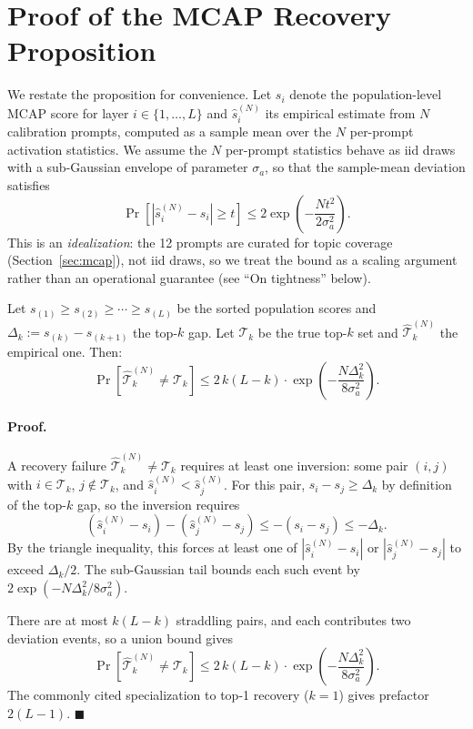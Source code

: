 \documentclass{article}
\begin{document}
\section{Proof of the MCAP Recovery Proposition}
\label{app:mcap_proof}

We restate the proposition for convenience. Let $s_i$ denote the population-level MCAP
score for layer $i \in \{1, \ldots, L\}$ and $\hat{s}_i^{(N)}$ its empirical estimate from
$N$ calibration prompts, computed as a sample mean over the $N$ per-prompt activation
statistics. We assume the $N$ per-prompt statistics behave as iid draws with a
sub-Gaussian envelope of parameter $\sigma_a$, so that the sample-mean deviation
satisfies
\[
  \Pr\!\left[ \left| \hat{s}_i^{(N)} - s_i \right| \geq t \right] \leq 2 \exp\!\left( -\frac{N t^2}{2 \sigma_a^2} \right).
\]
This is an \emph{idealization}: the 12 prompts are curated for topic coverage
(Section~\ref{sec:mcap}), not iid draws, so we treat the bound as a scaling argument
rather than an operational guarantee (see ``On tightness'' below).

Let $s_{(1)} \geq s_{(2)} \geq \cdots \geq s_{(L)}$ be the sorted population scores and
$\Delta_k := s_{(k)} - s_{(k+1)}$ the top-$k$ gap. Let $\mathcal{T}_k$ be the true top-$k$
set and $\hat{\mathcal{T}}_k^{(N)}$ the empirical one. Then:
\[
  \Pr\!\left[ \hat{\mathcal{T}}_k^{(N)} \neq \mathcal{T}_k \right] \leq 2\,k(L-k) \cdot \exp\!\left( -\frac{N \Delta_k^2}{8 \sigma_a^2} \right).
\]

\paragraph{Proof.} A recovery failure $\hat{\mathcal{T}}_k^{(N)} \neq \mathcal{T}_k$
requires at least one inversion: some pair $(i, j)$ with $i \in \mathcal{T}_k$,
$j \notin \mathcal{T}_k$, and $\hat{s}_i^{(N)} < \hat{s}_j^{(N)}$. For this pair,
$s_i - s_j \geq \Delta_k$ by definition of the top-$k$ gap, so the inversion requires
\[
  (\hat{s}_i^{(N)} - s_i) - (\hat{s}_j^{(N)} - s_j) \leq -(s_i - s_j) \leq -\Delta_k.
\]
By the triangle inequality, this forces at least one of $|\hat{s}_i^{(N)} - s_i|$ or
$|\hat{s}_j^{(N)} - s_j|$ to exceed $\Delta_k / 2$. The sub-Gaussian tail bounds each
such event by $2 \exp(-N \Delta_k^2 / 8 \sigma_a^2)$.

There are at most $k(L-k)$ straddling pairs, and each contributes two deviation events,
so a union bound gives
\[
  \Pr\!\left[ \hat{\mathcal{T}}_k^{(N)} \neq \mathcal{T}_k \right] \leq 2\,k(L-k) \cdot \exp\!\left( -\frac{N \Delta_k^2}{8 \sigma_a^2} \right).
\]
The commonly cited specialization to top-1 recovery ($k=1$) gives prefactor $2(L-1)$.
\hfill $\blacksquare$
\end{document}
